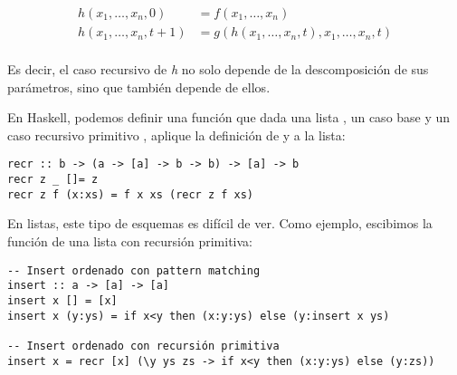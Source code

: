 \begin{align*}
	h(x_1,\dots,x_n,0) &= f(x_1,\dots,x_n) \\
	h(x_1,\dots,x_n,t+1) &= g(h(x_1,\dots,x_n, t),x_1,\dots, x_n, t) \\
\end{align*}

Es decir, el caso recursivo de \textit{h} no solo depende de la descomposición de sus parámetros, sino que también depende de ellos.

En Haskell, podemos definir una función que dada una lista , un caso base  y un caso recursivo primitivo , aplique la definición de  y  a la lista:
\begin{centrado}
	\begin{verbatim}
recr :: b -> (a -> [a] -> b -> b) -> [a] -> b
recr z _ []= z
recr z f (x:xs) = f x xs (recr z f xs)
	\end{verbatim}
\end{centrado}

En listas, este tipo de esquemas es difícil de ver. Como ejemplo, escibimos la función  de una lista con recursión primitiva:
\begin{centrado}
	\begin{verbatim}
-- Insert ordenado con pattern matching
insert :: a -> [a] -> [a]
insert x [] = [x]
insert x (y:ys) = if x<y then (x:y:ys) else (y:insert x ys)
		
-- Insert ordenado con recursión primitiva
insert x = recr [x] (\y ys zs -> if x<y then (x:y:ys) else (y:zs))
	\end{verbatim}
\end{centrado}


